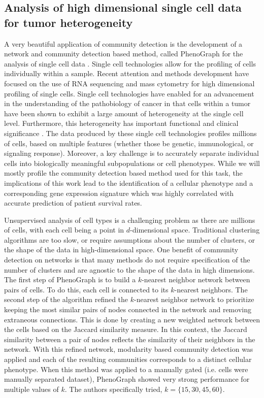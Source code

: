\subsection{Analysis of high dimensional single cell data for tumor heterogeneity}
\indent A very beautiful application of community detection is the development of a network and community detection based method, called PhenoGraph for the analysis of single cell data \cite{phenoGraph}. Single cell technologies allow for the profiling of cells individually within a sample. Recent attention and methods development have focused on the use of RNA sequencing and mass cytometry for high dimensional profiling of single cells. Single cell technologies have enabled for an advancement in the understanding of the pathobiology of cancer in that cells within a tumor have been shown to exhibit a large amount of heterogeneity at the single cell level. Furthermore, this heterogeneity has important functional and clinical significance \cite{intraTumor}. The data produced by these single cell technologies profiles millions of cells, based on multiple features (whether those be genetic, immunological, or signaling response). Moreover, a key challenge is to accurately separate individual cells into biologically meaningful subpopulations or cell phenotypes. While we will mostly profile the community detection based method used for this task, the implications of this work lead to the identification of a cellular phenotype and a corresponding gene expression signature which was highly correlated with accurate prediction of patient survival rates. 

\indent Unsupervised analysis of cell types is a challenging problem as there are millions of cells, with each cell being a point in $d$-dimensional space. Traditional clustering algorithms are too slow, or require assumptions about the number of clusters, or the shape of the data in high-dimensional space. One benefit of community detection on networks is that many methods do not require specification of the number of clusters and are agnostic to the shape of the data in high dimensions. The first step of PhenoGraph is to build a $k$-nearest neighbor network between pairs of cells. To do this, each cell is connected to its $k$-nearest neighbors. The second step of the algorithm refined the $k$-nearest neighbor network to prioritize keeping the most similar pairs of nodes connected in the network and removing extraneous connections. This is done by creating a new weighted network between the cells based on the Jaccard similarity measure. In this context, the Jaccard similarity between a pair of nodes reflects the similarity of their neighbors in the network. With this refined network, modularity based community detection was applied and each of the resulting communities corresponds to a distinct cellular phenotype. When this method was applied to a manually gated (i.e. cells were manually separated dataset),  PhenoGraph showed very strong performance for multiple values of $k$. The authors specifically tried, $k=\{15,30,45,60\}$. 

